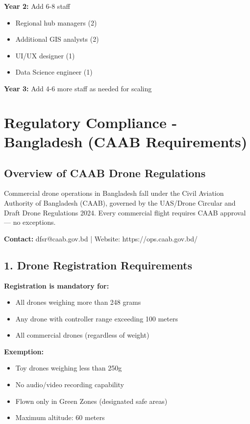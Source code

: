 \textbf{Year 2:} Add 6-8 staff
\begin{itemize}
    \item Regional hub managers (2)
    \item Additional GIS analysts (2)
    \item UI/UX designer (1)
    \item Data Science engineer (1)
\end{itemize}

\textbf{Year 3:} Add 4-6 more staff as needed for scaling

\section{Regulatory Compliance - Bangladesh (CAAB Requirements)}

\subsection{Overview of CAAB Drone Regulations}

\begin{importantbox}
    Commercial drone operations in Bangladesh fall under the Civil Aviation Authority of Bangladesh (CAAB), governed by the UAS/Drone Circular and Draft Drone Regulations 2024. Every commercial flight requires CAAB approval --- no exceptions.

    \textbf{Contact:} dfsr@caab.gov.bd | Website: https://ops.caab.gov.bd/
\end{importantbox}

\subsection{1. Drone Registration Requirements}

\textbf{Registration is mandatory for:}
\begin{itemize}
    \item All drones weighing more than 248 grams
    \item Any drone with controller range exceeding 100 meters
    \item All commercial drones (regardless of weight)
\end{itemize}

\textbf{Exemption:}
\begin{itemize}
    \item Toy drones weighing less than 250g
    \item No audio/video recording capability
    \item Flown only in Green Zones (designated safe areas)
    \item Maximum altitude: 60 meters
\end{itemize}

